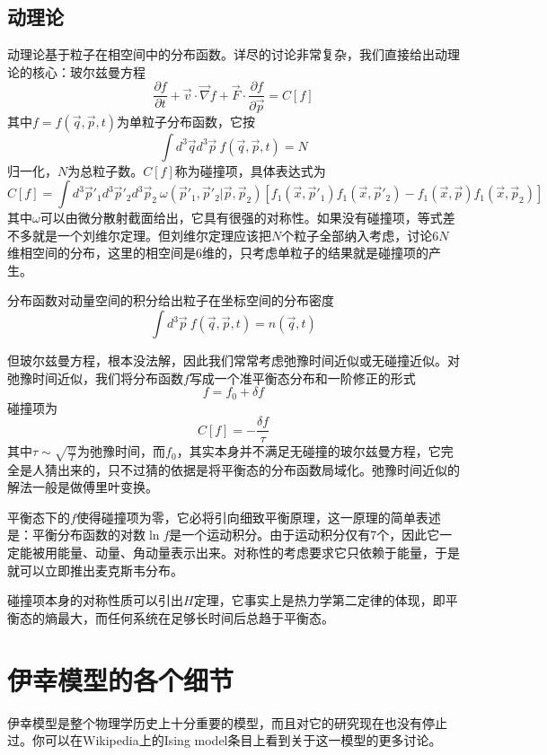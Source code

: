\documentclass[a4paper,11pt]{ctexart}
\newcommand{\beq}{\begin{equation}}
\newcommand{\eeq}{\end{equation}}
\newcommand{\red}{\color{red}}
\begin{document}
\subsection{动理论}
动理论基于粒子在相空间中的分布函数。详尽的讨论非常复杂，我们直接给出动理论的核心：玻尔兹曼方程
\beq
\frac{\partial f}{\partial t} + \vec{v} \cdot \vec{\nabla} f + \vec{F} \cdot \frac{\partial f}{\partial \vec{p}} = C[f]
\eeq
其中$f = f(\vec{q},\vec{p},t)$为单粒子分布函数，它按
\beq
\int d^3 \vec{q} d^3 \vec{p}\ f(\vec{q},\vec{p},t) = N
\eeq
归一化，$N$为总粒子数。$C[f]$称为碰撞项，具体表达式为
\beq
C[f] = \int d^3 \vec{p}'_1 d^3 \vec{p}'_2 d^3 \vec{p}_2\ \omega(\vec{p}'_1,\vec{p}'_2|\vec{p},\vec{p}_2)[f_1(\vec{x},\vec{p}'_1)f_1(\vec{x},\vec{p}'_2) - f_1(\vec{x},\vec{p})f_1(\vec{x},\vec{p}_2)]
\eeq
其中$\omega$可以由微分散射截面给出，它具有很强的对称性。如果没有碰撞项，等式差不多就是一个刘维尔定理。但刘维尔定理应该把$N$个粒子全部纳入考虑，讨论$6N$维相空间的分布，这里的相空间是6维的，只考虑单粒子的结果就是碰撞项的产生。\par
分布函数对动量空间的积分给出粒子在坐标空间的分布密度
\beq
\int  d^3 \vec{p}\ f(\vec{q},\vec{p},t) = n(\vec{q},t)
\eeq
\par
但玻尔兹曼方程，{\red 根本没法解}，因此我们常常考虑弛豫时间近似或无碰撞近似。对弛豫时间近似，我们将分布函数$f$写成一个准平衡态分布和一阶修正的形式
\beq
f = f_0 + \delta f
\eeq
碰撞项为
\beq
C[f] = - \frac{\delta f}{\tau}
\eeq
其中$\tau \sim \sqrt{\frac{m}{T}}$为弛豫时间，而$f_0$，其实本身并不满足无碰撞的玻尔兹曼方程，它完全是人猜出来的，只不过猜的依据是将平衡态的分布函数局域化。弛豫时间近似的解法一般是做傅里叶变换。
\par
平衡态下的$f$使得碰撞项为零，它必将引向{\red 细致平衡原理}，这一原理的简单表述是：平衡分布函数的对数$\ln f$是一个运动积分。由于运动积分仅有7个，因此它一定能被用能量、动量、角动量表示出来。对称性的考虑要求它只依赖于能量，于是就可以立即推出麦克斯韦分布。
\par
碰撞项本身的对称性质可以引出$H$定理，它事实上是热力学第二定律的体现，即平衡态的熵最大，而任何系统在足够长时间后总趋于平衡态。



\appendix
\section{伊幸模型的各个细节}
伊幸模型是整个物理学历史上十分重要的模型，而且对它的研究现在也没有停止过。你可以在Wikipedia上的Ising model条目上看到关于这一模型的更多讨论。
\end{document}

